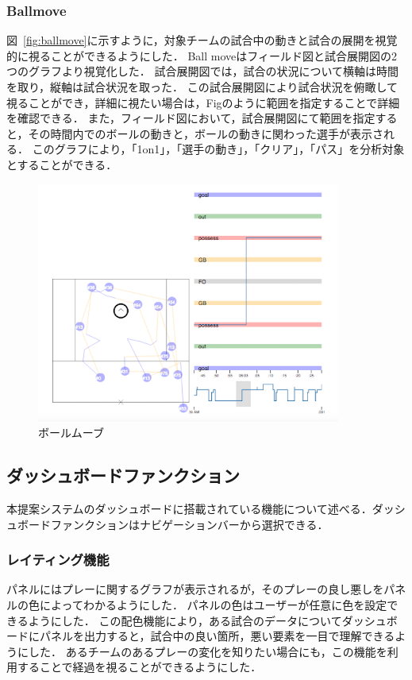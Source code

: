 \documentclass[sotsuron]{kuee}
\begin{document}
			\subsubsection{Ballmove}
				図~\ref{fig:ballmove}に示すように，対象チームの試合中の動きと試合の展開を視覚的に視ることができるようにした．
				Ball moveはフィールド図と試合展開図の2つのグラフより視覚化した．
				試合展開図では，試合の状況について横軸は時間を取り，縦軸は試合状況を取った．
				この試合展開図により試合状況を俯瞰して視ることができ，詳細に視たい場合は，Figのように範囲を指定することで詳細を確認できる．
				また，フィールド図において，試合展開図にて範囲を指定すると，その時間内でのボールの動きと，ボールの動きに関わった選手が表示される．
				このグラフにより，「1on1」，「選手の動き」，「クリア」，「パス」を分析対象とすることができる．
					\begin{figure}
						\begin{center}
							\includegraphics[width=10cm]{./png/ballmove.png}
						\end{center}
						\caption{ボールムーブ}
				  		\label{fig:basllmove}
					\end{figure}
		\subsection{ダッシュボードファンクション}
			本提案システムのダッシュボードに搭載されている機能について述べる．ダッシュボードファンクションはナビゲーションバーから選択できる．
			\subsubsection{レイティング機能}
			パネルにはプレーに関するグラフが表示されるが，そのプレーの良し悪しをパネルの色によってわかるようにした．
			パネルの色はユーザーが任意に色を設定できるようにした．
			この配色機能により，ある試合のデータについてダッシュボードにパネルを出力すると，試合中の良い箇所，悪い要素を一目で理解できるようにした．
			あるチームのあるプレーの変化を知りたい場合にも，この機能を利用することで経過を視ることができるようにした．
\end{document}
